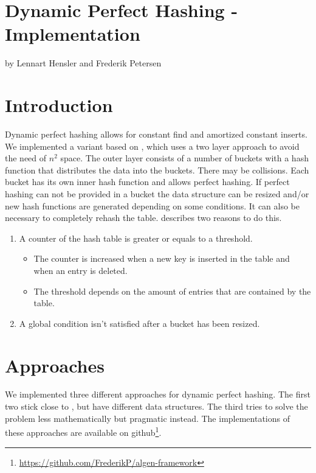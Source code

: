 \documentclass{article}
\begin{document}
\section*{Dynamic Perfect Hashing - Implementation}

by Lennart Hensler and Frederik Petersen

\section{Introduction}

Dynamic perfect hashing allows for constant find and amortized constant inserts.
We implemented a variant based on \cite{di94}, which uses a two layer approach
to avoid the need of $ n^2 $ space. The outer layer consists of a number of
buckets with a hash function that distributes the data into the buckets. There
may be collisions. Each bucket has its own inner hash function and allows
perfect hashing. If perfect hashing can not be provided in a bucket the data
structure can be resized and/or new hash functions are generated depending on
some conditions. It can also be necessary to completely rehash the table. \cite{di94} describes two reasons to do this.
\begin{enumerate}
  \item A counter of the hash table is greater or equals to a threshold.
  \begin{itemize}
    \item The counter is increased when a new key is inserted in the table and when an entry is deleted.
    \item The threshold depends on the amount of entries that are contained by the table.
  \end{itemize}
  \item A global condition isn't satisfied after a bucket has been resized.
\end{enumerate}

\section {Approaches}

We implemented three different approaches for dynamic perfect hashing. The first two stick close to \cite{di94}, but have different data structures. The third tries to solve the problem less mathematically but pragmatic instead. The implementations of these approaches are available on github\footnote{\href{https://github.com/FrederikP/algen-framework}{https://github.com/FrederikP/algen-framework}}.
\end{document}
